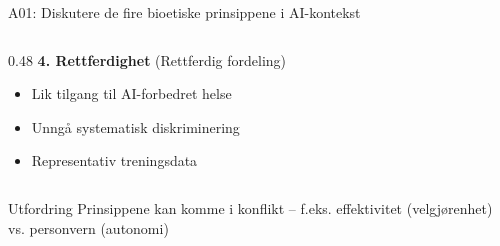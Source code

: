 \documentclass[aspectratio=169, 10pt]{beamer}
\begin{document}
\begin{frame}{A01: Diskutere de fire bioetiske prinsippene i AI-kontekst}
\begin{columns}[T]
\begin{column}{0.48\textwidth}
            \vspace{0.3cm}
            \textbf{4. Rettferdighet} (Rettferdig fordeling)
            \begin{itemize}
                \item Lik tilgang til AI-forbedret helse
                \item Unngå systematisk diskriminering
                \item Representativ treningsdata
            \end{itemize}
        \end{column}
    \end{columns}
    
    \vspace{0.3cm}
    \begin{block}{Utfordring}
        Prinsippene kan komme i konflikt -- f.eks. effektivitet (velgjørenhet) vs. personvern (autonomi)
    \end{block}
\end{frame}
\end{document}
